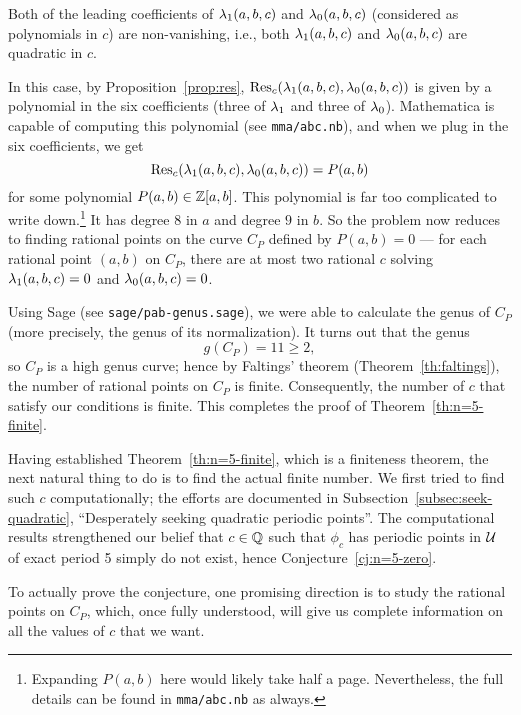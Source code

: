 \begin{case}
  Both of the leading coefficients of $\lambda_1(a, b, c)$ and $\lambda_0(a, b,
  c)$ (considered as polynomials in $c$) are non-vanishing, i.e., both
  $\lambda_1(a, b, c)$ and $\lambda_0(a, b, c)$ are quadratic in $c$.

  In this case, by Proposition~\ref{prop:res}, $\mathrm{Res}_c(\lambda_1(a, b, c),
  \lambda_0(a, b, c))$ is given by a polynomial in the six coefficients
  (three of $\lambda_1$ and three of $\lambda_0$). Mathematica is capable of
  computing this polynomial (see \texttt{mma/abc.nb}), and when we
  plug in the six coefficients, we get
  \[
  \label{eq:pab}
  \mathrm{Res}_c(\lambda_1(a, b, c), \lambda_0(a, b, c)) = P(a, b)
  \]
  for some polynomial $P(a, b) \in \mathbb{Z}[a, b]$. This polynomial is far
  too complicated to write down.\footnote{%
    Expanding $P(a, b)$ here would likely take half a
    page. Nevertheless, the full details can be found in
    \texttt{mma/abc.nb} as always.}
  It has degree $8$ in $a$ and degree $9$ in $b$. So the problem now
  reduces to finding rational points on the curve $C_P$ defined by
  $P(a, b) = 0$ --- for each rational point $(a, b)$ on $C_P$, there
  are at most two rational $c$ solving $\lambda_1(a, b, c) = 0$ and
  $\lambda_0(a, b, c) = 0$.

  Using Sage (see \texttt{sage/pab-genus.sage}), we were able to
  calculate the genus of $C_P$ (more precisely, the genus of its
  normalization). It turns out that the genus
  \[
  g(C_P) = 11 \ge 2,
  \]
  so $C_P$ is a high genus curve; hence by Faltings' theorem
  (Theorem~\ref{th:faltings}), the number of rational points on $C_P$
  is finite. Consequently, the number of $c$ that satisfy our
  conditions is finite. This completes the proof of
  Theorem~\ref{th:n=5-finite}.
\end{case}

Having established Theorem~\ref{th:n=5-finite}, which is a finiteness
theorem, the next natural thing to do is to find the actual finite
number. We first tried to find such $c$ computationally; the efforts
are documented in Subsection~\ref{subsec:seek-quadratic},
``Desperately seeking quadratic periodic points''. The computational
results strengthened our belief that $c \in \mathbb{Q}$ such that $\phi_c$ has
periodic points in $\mathcal{U}$ of exact period 5 simply do not exist, hence
Conjecture~\ref{cj:n=5-zero}.

To actually prove the conjecture, one promising direction is to study
the rational points on $C_P$, which, once fully understood, will give
us complete information on all the values of $c$ that we want.

